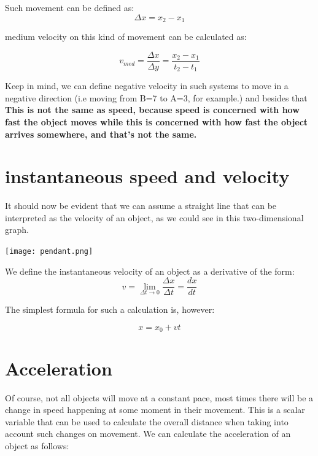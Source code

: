 \documentclass[11pt,fleqn]{book} %
\begin{document}
Such movement can be defined as:
\begin{equation}
    \Delta x = x_2 - x_1   
\end{equation}

medium velocity on this kind of movement can be calculated as:

\begin{equation}
    v_{med} = \frac{\Delta x}{\Delta y} = \frac{x_2 - x_1}{t_2 - t_1}
\end{equation}

Keep in mind, we can define negative velocity in such systems to move in a
negative direction (i.e moving from B=7 to A=3, for example.) and besides that
\textbf{This is not the same as speed, because speed is concerned with how fast the object moves
while this is concerned with how fast the object arrives somewhere, and that's not the same.}

\section{instantaneous speed and velocity}

It should now be evident that we can assume a straight line that can be interpreted as the velocity of an
object, as we could see in this two-dimensional graph.

\begin{center}
    \texttt{[image: pendant.png]}    
\end{center}

We define the instantaneous velocity of an object as a derivative of the form:
\begin{equation}
    v = \lim_{\Delta t \to 0} \frac{\Delta x}{\Delta t} = \frac{dx}{dt}   
\end{equation}

The simplest formula for such a calculation is, however:

\begin{equation}
    x = x_0 + vt
\end{equation}


\section{Acceleration}

Of course, not all objects will move at a constant pace, most times there will be a 
change in speed happening at some moment in their movement. This is a scalar 
variable that can be used to calculate the overall distance when taking into account
such changes on movement. We can calculate the acceleration of an object as follows:
\end{document}
